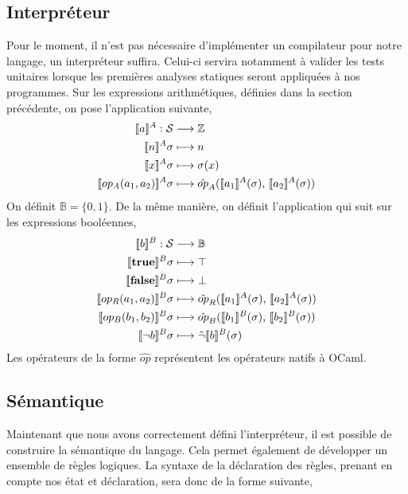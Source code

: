 \documentclass[a4paper, 10pt]{article}
\begin{document}
\subsection{Interpréteur}
Pour le moment, il n'est pas nécessaire d'implémenter un compilateur pour notre langage, un interpréteur suffira.
Celui-ci servira notamment à valider les tests unitaires lorsque les premières analyses statiques seront appliquées
à nos programmes.
Sur les expressions arithmétiques, définies dans la section précédente, on pose l'application suivante,
\begin{align*}
	\intrfun{\arithexp}{A}:\mathcal{S}&\longrightarrow\mathbb{Z}\\
	\intrfun{n}{A}\sigma&\longmapsto n\\
	\intrfun{x}{A}\sigma&\longmapsto\sigma(x)\\
	\intrfun{op_A(a_1, a_2)}{A}\sigma&\longmapsto\hat{op}_A(\intr{a_1}{A}{\sigma}\text{, }\intr{a_2}{A}{\sigma})\\
\end{align*}
On définit $\mathbb{B} = \{0, 1\}$. De la même manière, on définit l'application qui suit sur les expressions booléennes,
\begin{align*}
	\intrfun{\boolexp}{B}:\mathcal{S}&\longrightarrow\mathbb{B}\\	
	\intrfun{\textbf{true}}{B}\sigma&\longmapsto\top\\
	\intrfun{\textbf{false}}{B}\sigma&\longmapsto\bot\\
	\intrfun{op_R(a_1, a_2)}{B}\sigma &\longmapsto \hat{op}_R(\intr{a_1}{A}{\sigma}\text{, }\intr{a_2}{A}{\sigma})\\
	\intrfun{op_B(b_1, b_2)}{B}\sigma&\longmapsto \hat{op}_B(\intr{b_1}{B}{\sigma}\text{, }\intr{b_2}{B}{\sigma})\\
	\intrfun{\neg b}{B}\sigma&\longmapsto\hat{\neg}\intr{b}{B}{\sigma}
\end{align*}
Les opérateurs de la forme $\hat{op}$ représentent les opérateurs natifs à OCaml.

\subsection{Sémantique}
Maintenant que nous avons correctement défini l'interpréteur, il est possible 
de construire la sémantique du langage. Cela permet également de développer 
un ensemble de règles logiques. La syntaxe de la déclaration des règles,
prenant en compte nos état et déclaration, sera donc de la forme suivante,
\end{document}
